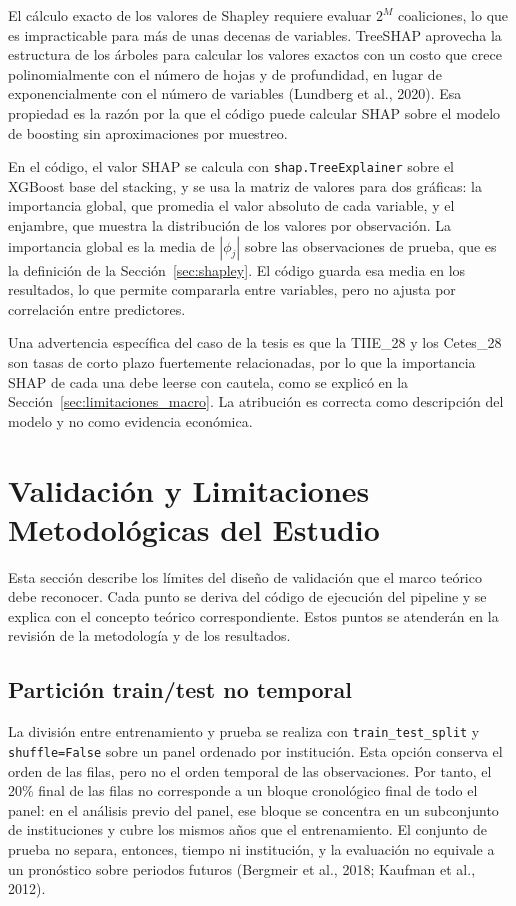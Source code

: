 El cálculo exacto de los valores de Shapley requiere evaluar $2^M$ coaliciones, lo que es impracticable para más de unas decenas de variables. TreeSHAP aprovecha la estructura de los árboles para calcular los valores exactos con un costo que crece polinomialmente con el número de hojas y de profundidad, en lugar de exponencialmente con el número de variables (Lundberg et al., 2020). Esa propiedad es la razón por la que el código puede calcular SHAP sobre el modelo de boosting sin aproximaciones por muestreo.

En el código, el valor SHAP se calcula con \texttt{shap.TreeExplainer} sobre el XGBoost base del stacking, y se usa la matriz de valores para dos gráficas: la importancia global, que promedia el valor absoluto de cada variable, y el enjambre, que muestra la distribución de los valores por observación. La importancia global es la media de $|\phi_j|$ sobre las observaciones de prueba, que es la definición de la Sección~\ref{sec:shapley}. El código guarda esa media en los resultados, lo que permite compararla entre variables, pero no ajusta por correlación entre predictores.

Una advertencia específica del caso de la tesis es que la TIIE\_28 y los Cetes\_28 son tasas de corto plazo fuertemente relacionadas, por lo que la importancia SHAP de cada una debe leerse con cautela, como se explicó en la Sección~\ref{sec:limitaciones_macro}. La atribución es correcta como descripción del modelo y no como evidencia económica.

\section{Validación y Limitaciones Metodológicas del Estudio}\label{sec:limitaciones_marco}

Esta sección describe los límites del diseño de validación que el marco teórico debe reconocer. Cada punto se deriva del código de ejecución del pipeline y se explica con el concepto teórico correspondiente. Estos puntos se atenderán en la revisión de la metodología y de los resultados.

\subsection{Partición train/test no temporal}
La división entre entrenamiento y prueba se realiza con \texttt{train\_test\_split} y \texttt{shuffle=False} sobre un panel ordenado por institución. Esta opción conserva el orden de las filas, pero no el orden temporal de las observaciones. Por tanto, el 20\% final de las filas no corresponde a un bloque cronológico final de todo el panel: en el análisis previo del panel, ese bloque se concentra en un subconjunto de instituciones y cubre los mismos años que el entrenamiento. El conjunto de prueba no separa, entonces, tiempo ni institución, y la evaluación no equivale a un pronóstico sobre periodos futuros (Bergmeir et al., 2018; Kaufman et al., 2012).%

